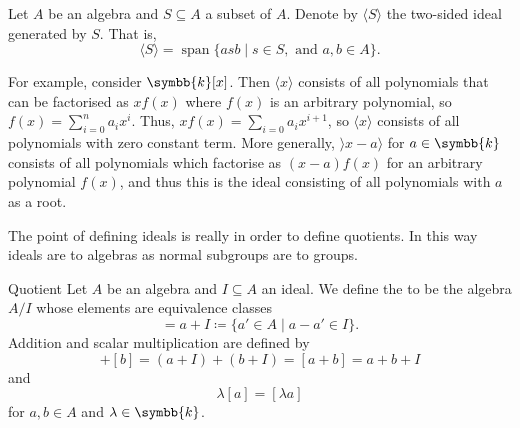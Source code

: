 \documentclass[fleqn]{NotesClass}
\renewcommand{\field}{\symbb{k}}
\DeclareMathOperator{\Span}{span}
\begin{document}
    \begin{ntn}{}{}
        Let \(A\) be an algebra and \(S \subseteq A\) a subset of \(A\).
        Denote by \(\langle S \rangle\) the two-sided ideal generated by \(S\).
        That is,
        \begin{equation}
            \langle S \rangle = \Span\{asb \mid s \in S, \text{ and } a, b \in A\}.
        \end{equation}
    \end{ntn}
    
    For example, consider \(\field[x]\).
    Then \(\langle x \rangle\) consists of all polynomials that can be factorised as \(xf(x)\) where \(f(x)\) is an arbitrary polynomial, so \(f(x) = \sum_{i=0}^n a_i x^i\).
    Thus, \(x f(x) = \sum_{i=0} a_i x^{i + 1}\), so \(\langle x \rangle\) consists of all polynomials with zero constant term.
    More generally, \(\rangle x - a \rangle\) for \(a \in \field\) consists of all polynomials which factorise as \((x - a)f(x)\) for an arbitrary polynomial \(f(x)\), and thus this is the ideal consisting of all polynomials with \(a\) as a root.
    
    The point of defining ideals is really in order to define quotients.
    In this way ideals are to algebras as normal subgroups are to groups.
    
    \begin{dfn}{Quotient}{}
        Let \(A\) be an algebra and \(I \subseteq A\) an ideal.
        We define the  to be the algebra \(A/I\) whose elements are equivalence classes
        \begin{equation}
            [a] = a + I \coloneq \{a' \in A \mid a - a' \in I\}.
        \end{equation}
        Addition and scalar multiplication are defined by
        \begin{equation}
            [a] + [b] = (a + I) + (b + I) = [a + b] = a + b + I
        \end{equation}
        and
        \begin{equation}
            \lambda[a] = [\lambda a]
        \end{equation}
        for \(a, b \in A\) and \(\lambda \in \field\).
    \end{dfn}
    
\end{document}
